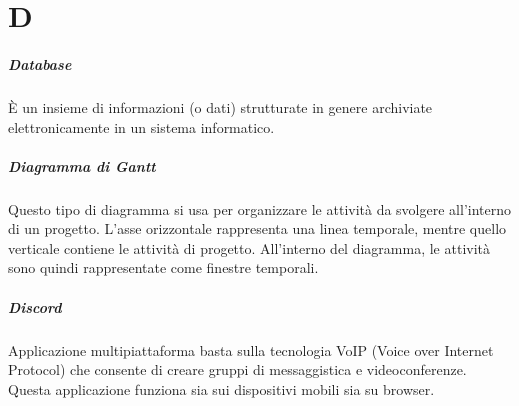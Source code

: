 \chapter{D}

\paragraph*{Database}
È un insieme di informazioni (o dati) strutturate in genere archiviate elettronicamente in un sistema informatico.

\paragraph*{Diagramma di Gantt}
Questo tipo di diagramma si usa per organizzare le attività da svolgere all'interno di un progetto. L'asse orizzontale rappresenta una linea temporale, mentre quello verticale contiene le attività di progetto. All'interno del diagramma, le attività sono quindi rappresentate come finestre temporali.

\paragraph*{Discord}
Applicazione multipiattaforma basta sulla tecnologia VoIP (Voice over Internet Protocol) che consente di creare gruppi di messaggistica e videoconferenze. Questa applicazione funziona sia sui dispositivi mobili sia su browser.
